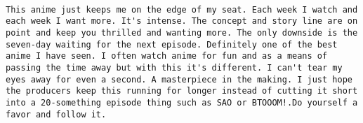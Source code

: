 \documentclass[
]{article}
\begin{document}
\begin{verbatim}
                                                                                                                                                                                                                                                                                                                                                                                                                                                                                                                                                                                                                                                                                                                                                                                                                                                                                                                                                                                                                                                                                                                                                                                                                                                                                                                                                                                                                                                                                                                                                                                                                                                                                                                                                                                                                                                                                                                                                                                                                                                                                                                                                                                                                                                                                                                                                                                                                                                                                                                                                                                          This anime just keeps me on the edge of my seat. Each week I watch and each week I want more. It's intense. The concept and story line are on point and keep you thrilled and wanting more. The only downside is the seven-day waiting for the next episode. Definitely one of the best anime I have seen. I often watch anime for fun and as a means of passing the time away but with this it's different. I can't tear my eyes away for even a second. A masterpiece in the making. I just hope the producers keep this running for longer instead of cutting it short into a 20-something episode thing such as SAO or BTOOOM!.Do yourself a favor and follow it.

\end{verbatim}
\end{document}
